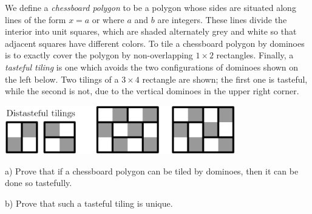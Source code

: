 We define a \textit{chessboard polygon} to be a polygon whose sides are situated along lines of the form $ x = a$ or  where $ a$ and $ b$ are integers. These lines divide the interior into unit squares, which are shaded alternately grey and white so that adjacent squares have different colors. To tile a chessboard polygon by dominoes is to exactly cover the polygon by non-overlapping $ 1 \times 2$ rectangles. Finally, a \textit{tasteful tiling} is one which avoids the two configurations of dominoes shown on the left below. Two tilings of a $ 3 \times 4$ rectangle are shown; the first one is tasteful, while the second is not, due to the vertical dominoes in the upper right corner.

\begin{center}
\includegraphics[width = 100.4mm]{img/fig0.png}
\end{center} a) Prove that if a chessboard polygon can be tiled by dominoes, then it can be done so tastefully.

b) Prove that such a tasteful tiling is unique.
